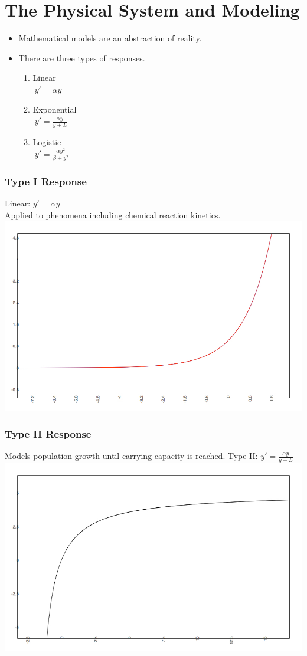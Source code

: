 
\section{The Physical System and Modeling}
\begin{frame}
  \begin{itemize}
	\item Mathematical models are an abstraction of reality.
	\item There are three types of responses. 
	\begin{enumerate}
		\item Linear\\
		$\ y'=\alpha y$
		\item Exponential\\
		$\ y' = \frac{\alpha y}{y+ L}$ 
		\item Logistic\\
		$\ y'= \frac {\alpha y^2}{\beta + y^2}$
	\end{enumerate}
  \end{itemize}
\end{frame}

\begin{frame}
  \frametitle{Type I Response}
   Linear: $y'=\alpha y$\\ Applied to phenomena including chemical reaction kinetics.
   \includegraphics[scale=.4]{typeI}
\end{frame}

\begin{frame}
  \frametitle{Type II Response} Models population growth until carrying capacity is reached.
    Type II: $y'=\frac{\alpha y}{y+L}$
   \includegraphics[natwidth=162bp, natheight=227bp,width=280bp]{typeII.jpg}
\end{frame}

